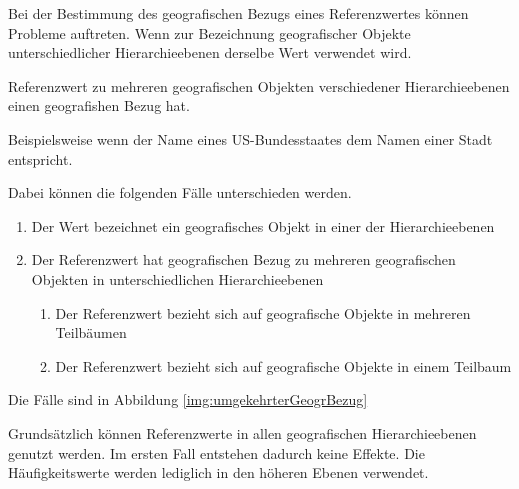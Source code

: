 				Bei der Bestimmung des geografischen Bezugs eines Referenzwertes können Probleme auftreten. 
				Wenn zur Bezeichnung geografischer Objekte unterschiedlicher Hierarchieebenen derselbe Wert verwendet wird.

				Referenzwert zu mehreren geografischen Objekten verschiedener Hierarchieebenen einen geografishen Bezug hat.
				
				Beispielsweise wenn der Name eines US-Bundesstaates dem Namen einer Stadt entspricht. 

				Dabei können die folgenden Fälle unterschieden werden.

				\begin{enumerate}
				  	\item Der Wert bezeichnet ein geografisches Objekt in einer der Hierarchieebenen
				  	\item Der Referenzwert hat geografischen Bezug zu mehreren geografischen Objekten in unterschiedlichen Hierarchieebenen
				  	\begin{enumerate}
				  		\item Der Referenzwert bezieht sich auf geografische Objekte in mehreren Teilbäumen
				  		\item Der Referenzwert bezieht sich auf geografische Objekte in einem Teilbaum
				  	\end{enumerate}
				  \end{enumerate}  

				Die Fälle sind in Abbildung \ref{img:umgekehrterGeogrBezug} 

				Grundsätzlich können Referenzwerte in allen geografischen Hierarchieebenen genutzt werden. 
				Im ersten Fall entstehen dadurch keine Effekte. 
				Die Häufigkeitswerte werden lediglich in den höheren Ebenen verwendet.




	